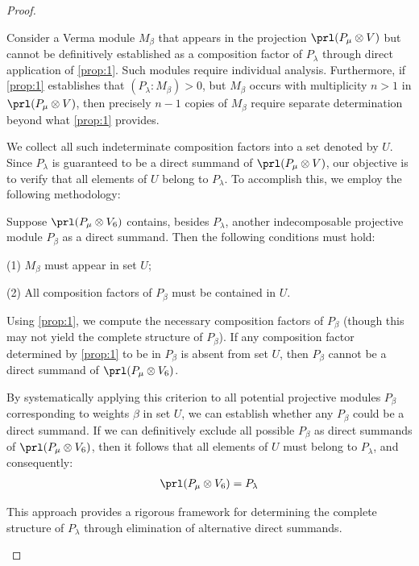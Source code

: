 \begin{proof}
\begin{enumerate}
\begin{enumerate}
Consider a Verma module $M_\beta$ that appears in the projection $\prl(P_\mu \otimes V)$ but cannot be definitively established as a composition factor of $P_\lambda$ through direct application of \cref{prop:1}. Such modules require individual analysis. Furthermore, if \cref{prop:1} establishes that $(P_\lambda:M_\beta)>0$, but $M_\beta$ occurs with multiplicity $n>1$ in $\prl(P_\mu \otimes V)$, then precisely $n-1$ copies of $M_\beta$ require separate determination beyond what \cref{prop:1} provides.

We collect all such indeterminate composition factors into a set denoted by $U$. Since $P_\lambda$ is guaranteed to be a direct summand of $\prl(P_\mu \otimes V)$, our objective is to verify that all elements of $U$ belong to $P_\lambda$. To accomplish this, we employ the following methodology:

Suppose $\prl(P_\mu \otimes V_6)$ contains, besides $P_\lambda$, another indecomposable projective module $P_\beta$ as a direct summand. Then the following conditions must hold:

    (1) $M_\beta$ must appear in set $U$; \par
    (2) All composition factors of $P_\beta$ must be contained in $U$.

Using \cref{prop:1}, we compute the necessary composition factors of $P_\beta$ (though this may not yield the complete structure of $P_\beta$). If any composition factor determined by \cref{prop:1} to be in $P_\beta$ is absent from set $U$, then $P_\beta$ cannot be a direct summand of $\prl(P_\mu \otimes V_6)$.

By systematically applying this criterion to all potential projective modules $P_\beta$ corresponding to weights $\beta$ in set $U$, we can establish whether any $P_\beta$ could be a direct summand. If we can definitively exclude all possible $P_\beta$ as direct summands of $\prl(P_\mu \otimes V_6)$, then it follows that all elements of $U$ must belong to $P_\lambda$, and consequently:
\begin{equation}\notag
  \begin{aligned}
    \prl(P_\mu \otimes V_6) = P_\lambda
  \end{aligned}
\end{equation}

This approach provides a rigorous framework for determining the complete structure of $P_\lambda$ through elimination of alternative direct summands.


\end{enumerate}
\end{enumerate}
\end{proof}
